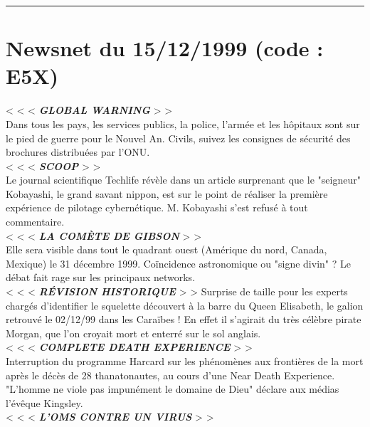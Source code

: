 \documentclass[11pt,twoside,a4paper]{book}
\begin{document}
\hrule

\clearpage

\section*{Newsnet du 15/12/1999 (code : E5X)}

< < <  \textbf{\textit{GLOBAL WARNING}} > >~\\
Dans tous les pays, les services publics, la police, l'arm{\'e}e et les h{\^o}pitaux sont sur le pied de guerre pour le Nouvel An. Civils, suivez les consignes de s{\'e}curit{\'e} des brochures distribu{\'e}es par l'ONU.~\\
< < <  \textbf{\textit{SCOOP}} > >~\\
Le journal scientifique Techlife r{\'e}v{\`e}le dans un article surprenant que le "seigneur" Kobayashi, le grand savant nippon, est sur le point de r{\'e}aliser la premi{\`e}re exp{\'e}rience de pilotage cybern{\'e}tique. M. Kobayashi s'est refus{\'e} {\`a} tout commentaire.~\\
< < <  \textbf{\textit{LA COM{\`E}TE DE GIBSON}} > >~\\
Elle sera visible dans tout le quadrant ouest (Am{\'e}rique du nord, Canada, Mexique) le 31 d{\'e}cembre 1999. Co{\"i}ncidence astronomique ou "signe divin" ? Le d{\'e}bat fait rage sur les principaux networks.~\\
< < <  \textbf{\textit{R{\'E}VISION HISTORIQUE}} > >
Surprise de taille pour les experts charg{\'e}s d'identifier le squelette d{\'e}couvert {\`a} la barre du Queen Elisabeth, le galion retrouv{\'e} le 02/12/99 dans les Cara{\"i}bes ! En effet il s'agirait du tr{\`e}s c{\'e}l{\`e}bre pirate Morgan, que l'on croyait mort et enterr{\'e} sur le sol anglais.~\\
< < <  \textbf{\textit{COMPLETE DEATH EXPERIENCE}} > >~\\
Interruption du programme Harcard sur les ph{\'e}nom{\`e}nes aux fronti{\`e}res de la mort apr{\`e}s le d{\'e}c{\`e}s de 28 thanatonautes, au cours d'une Near Death Experience. "L'homme ne viole pas impun{\'e}ment le domaine de Dieu" d{\'e}clare aux m{\'e}dias l'{\'e}v{\^e}que Kingsley.~\\
< < <  \textbf{\textit{L'OMS CONTRE UN VIRUS}} > >~\\
\end{document}

